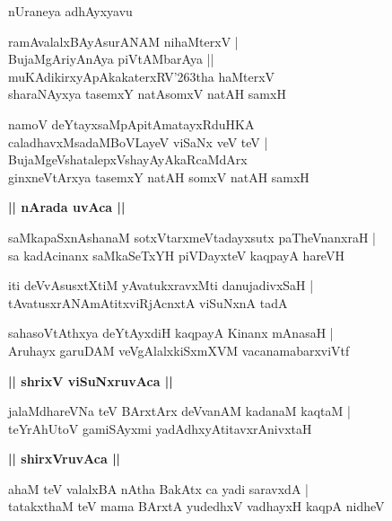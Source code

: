 \documentclass[twoside,12pt,openright]{book}
\def\S{\char'263}
\newcounter{shloka}[chapter]
\def\uvaca#1{\centerline{{\large\textbf{#1}}}}
\begin{document}
\begin{center}
nUraneya adhAyxyavu
\end{center}

\begin{shloka}%
ramAvalalxBAyAsurANAM nihaMterxV |\\
BujaMgAriyAnAya piVtAMbarAya ||\\
muKAdikirxyApAkakaterxRV\S tha haMterxV \\
sharaNAyxya tasemxY natAsomxV natAH samxH 
\end{shloka}

\begin{shloka}%
namoV deYtayxsaMpApitAmatayxRduHKA \\
caladhavxMsadaMBoVLayeV viSaNx veV teV |\\
BujaMgeVshatalepxVshayAyAkaRcaMdArx \\
ginxneVtArxya tasemxY natAH somxV natAH samxH 
\end{shloka}

\uvaca{|| nArada uvAca ||}

\begin{shloka}%
saMkapaSxnAshanaM sotxVtarxmeVtadayxsutx paTheVnanxraH |\\
sa kadAcinanx saMkaSeTxYH piVDayxteV kaqpayA hareVH 
\end{shloka}

\begin{shloka}%
iti deVvAsusxtXtiM yAvatukxravxMti danujadivxSaH |\\
tAvatusxrANAmAtitxviRjAcnxtA viSuNxnA tadA
\end{shloka}

\begin{shloka}%
sahasoVtAthxya deYtAyxdiH kaqpayA Kinanx mAnasaH |\\
Aruhayx garuDAM veVgAlalxkiSxmXVM vacanamabarxviVtf
\end{shloka}

\uvaca{|| shrixV viSuNxruvAca ||}

\begin{shloka}%
jalaMdhareVNa teV BArxtArx deVvanAM kadanaM kaqtaM |\\
teYrAhUtoV gamiSAyxmi yadAdhxyAtitavxrAnivxtaH 
\end{shloka}

\uvaca{|| shirxVruvAca ||}

\begin{shloka}%
ahaM teV valalxBA nAtha BakAtx ca yadi saravxdA |\\
tatakxthaM teV mama BArxtA yudedhxV vadhayxH kaqpA nidheV 
\end{shloka}
\end{document}
